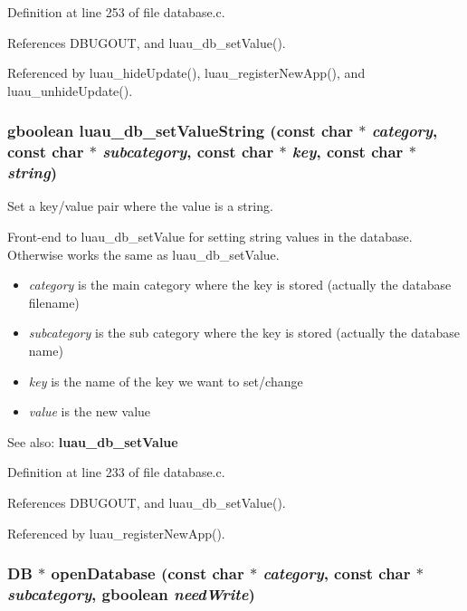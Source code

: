Definition at line 253 of file database.c.

References DBUGOUT, and luau\_\-db\_\-set\-Value().

Referenced by luau\_\-hide\-Update(), luau\_\-register\-New\-App(), and luau\_\-unhide\-Update().
\subsubsection{\setlength{\rightskip}{0pt plus 5cm}gboolean luau\_\-db\_\-set\-Value\-String (const char $\ast$ {\em category}, const char $\ast$ {\em subcategory}, const char $\ast$ {\em key}, const char $\ast$ {\em string})}\label{database_8c_a9}


Set a key/value pair where the value is a string. 

Front-end to luau\_\-db\_\-set\-Value for setting string values in the database. Otherwise works the same as luau\_\-db\_\-set\-Value.

\begin{itemize}
\item {\em category\/} is the main category where the key is stored (actually the database filename) \item {\em subcategory\/} is the sub category where the key is stored (actually the database name) \item {\em key\/} is the name of the key we want to set/change \item {\em value\/} is the new value\end{itemize}
\begin{Desc}
\item[See also:]{\bf luau\_\-db\_\-set\-Value} \end{Desc}


Definition at line 233 of file database.c.

References DBUGOUT, and luau\_\-db\_\-set\-Value().

Referenced by luau\_\-register\-New\-App().
\subsubsection{\setlength{\rightskip}{0pt plus 5cm}DB $\ast$ open\-Database (const char $\ast$ {\em category}, const char $\ast$ {\em subcategory}, gboolean {\em need\-Write})\hspace{0.3cm}{\tt  [static]}}\label{database_8c_a3}


